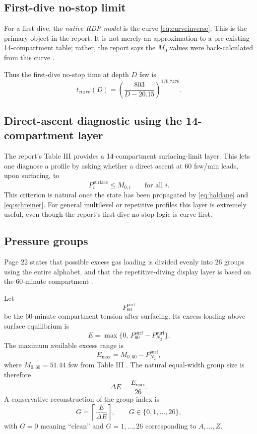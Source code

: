 \documentclass[11pt]{article}
\begin{document}
\subsection{First-dive no-stop limit}

For a first dive, the \emph{native RDP model} is the curve \eqref{eq:curveinverse}. This is the primary object in the report. It is not merely an approximation to a pre-existing 14-compartment table; rather, the report says the $M_0$ values were back-calculated from this curve \cite[p.~21]{Hamilton1994}.

Thus the first-dive no-stop time at depth $D$ fsw is
\[
t_{\mathrm{curve}}(D)
=
\left(\frac{803}{D-20.15}\right)^{1/0.7476}.
\]

\subsection{Direct-ascent diagnostic using the 14-compartment layer}

The report's Table III provides a 14-compartment surfacing-limit layer. This lets one diagnose a profile by asking whether a direct ascent at $60$ fsw/min leads, upon surfacing, to
\begin{equation}
P_i^{\mathrm{surface}} \le M_{0,i}
\qquad\text{for all } i.
\label{eq:m0criterion}
\end{equation}
This criterion is natural once the state has been propagated by \eqref{eq:haldane} and \eqref{eq:schreiner}. For general multilevel or repetitive profiles this layer is extremely useful, even though the report's first-dive no-stop logic is curve-first.

\subsection{Pressure groups}

Page 22 states that possible excess gas loading is divided evenly into $26$ groups using the entire alphabet, and that the repetitive-diving display layer is based on the $60$-minute compartment \cite[p.~22]{Hamilton1994}.

Let
\[
P_{60}^{\mathrm{surf}}
\]
be the 60-minute compartment tension after surfacing. Its excess loading above surface equilibrium is
\[
E = \max\{0,\, P_{60}^{\mathrm{surf}} - P_{N_2}^{\mathrm{surf}}\}.
\]
The maximum available excess range is
\[
E_{\max}=M_{0,60}-P_{N_2}^{\mathrm{surf}},
\]
where $M_{0,60}=51.44$ fsw from Table III \cite[p.~21]{Hamilton1994}. The natural equal-width group size is therefore
\begin{equation}
\Delta E = \frac{E_{\max}}{26}.
\label{eq:groupstep}
\end{equation}
A conservative reconstruction of the group index is
\begin{equation}
G = \left\lceil \frac{E}{\Delta E}\right\rceil,
\qquad G\in\{0,1,\dots,26\},
\label{eq:groupmap}
\end{equation}
with $G=0$ meaning ``clean'' and $G=1,\dots,26$ corresponding to $A,\dots,Z$.
\end{document}
